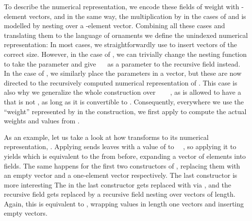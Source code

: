 To describe the numerical representation, we encode these fields of weight  with -element vectors, and in the same way, the multiplication by  in the cases of  and  is modelled by nesting over a -element vector. Combining all these cases and translating them to the language of ornaments we define the unindexed numerical representation:
In most cases, we straightforwardly use  to insert vectors of the correct size. However, in the case of , we can trivially change the nesting function to take the parameter  and give \ \  as a parameter to the recursive field instead. In the case of , we similarly place the parameters in a vector, but these are now directed to the recursively computed numerical representation of . This case is also why we generalize the whole construction over \ \AV{:} \ \ , as  is allowed to have a  that is not , as long as it is convertible to . Consequently, everywhere we use the ``weight'' represented by  in the construction, we first apply  to compute the actual weights and values from .

As an example, let us take a look at how  transforms  to its numerical representation, . Applying  sends leaves with a value of  to \ \ , so applying it to  yields
which is equivalent to the  from before, expanding a vector of  elements into  fields. The same happens for the first two constructors of , replacing them with an empty vector and a one-element vector respectively. The last constructor is more interesting
The  in the last constructor gets replaced with  via , and the recursive field gets replaced by a recursive field nesting over vectors of length. Again, this is equivalent to , wrapping values in length one vectors and inserting empty vectors.


